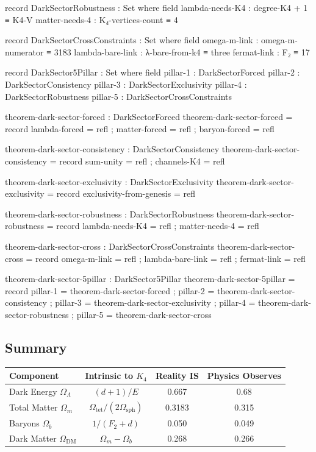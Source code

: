 \documentclass[11pt,a4paper]{book}
\begin{document}
\begin{code}
  record DarkSectorRobustness : Set where
    field
      lambda-needs-K4 : degree-K4 + 1 ≡ K4-V
      matter-needs-4  : K₄-vertices-count ≡ 4
  
  record DarkSectorCrossConstraints : Set where
    field
      omega-m-link     : omega-m-numerator ≡ 3183
      lambda-bare-link : λ-bare-from-k4 ≡ three
      fermat-link      : F₂ ≡ 17
  
  record DarkSector5Pillar : Set where
    field
      pillar-1 : DarkSectorForced
      pillar-2 : DarkSectorConsistency
      pillar-3 : DarkSectorExclusivity
      pillar-4 : DarkSectorRobustness
      pillar-5 : DarkSectorCrossConstraints
  
  theorem-dark-sector-forced : DarkSectorForced
  theorem-dark-sector-forced = record
    { lambda-forced = refl
    ; matter-forced = refl
    ; baryon-forced = refl
    }
  
  theorem-dark-sector-consistency : DarkSectorConsistency
  theorem-dark-sector-consistency = record
    { sum-unity   = refl
    ; channels-K4 = refl
    }
  
  theorem-dark-sector-exclusivity : DarkSectorExclusivity
  theorem-dark-sector-exclusivity = record
    { exclusivity-from-genesis = refl
    }
  
  theorem-dark-sector-robustness : DarkSectorRobustness
  theorem-dark-sector-robustness = record
    { lambda-needs-K4 = refl
    ; matter-needs-4  = refl
    }
  
  theorem-dark-sector-cross : DarkSectorCrossConstraints
  theorem-dark-sector-cross = record
    { omega-m-link     = refl
    ; lambda-bare-link = refl
    ; fermat-link      = refl
    }
  
  theorem-dark-sector-5pillar : DarkSector5Pillar
  theorem-dark-sector-5pillar = record
    { pillar-1 = theorem-dark-sector-forced
    ; pillar-2 = theorem-dark-sector-consistency
    ; pillar-3 = theorem-dark-sector-exclusivity
    ; pillar-4 = theorem-dark-sector-robustness
    ; pillar-5 = theorem-dark-sector-cross
    }
\end{code}

\subsection{Summary}

\begin{center}
\begin{tabular}{lccc}
\toprule
\textbf{Component} & \textbf{Intrinsic to $K_4$} & \textbf{Reality IS} & \textbf{Physics Observes} \\
\midrule
Dark Energy $\Omega_\Lambda$ & $(d+1)/E$ & 0.667 & 0.68 \\
Total Matter $\Omega_m$ & $\Omega_{\text{tet}}/(2\Omega_{\text{sph}})$ & 0.3183 & 0.315 \\
Baryons $\Omega_b$ & $1/(F_2 + d)$ & 0.050 & 0.049 \\
Dark Matter $\Omega_{\text{DM}}$ & $\Omega_m - \Omega_b$ & 0.268 & 0.266 \\
\bottomrule
\end{tabular}
\end{center}
\end{document}
